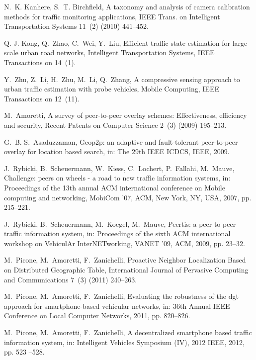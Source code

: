 \documentclass[10pt,onecolumn]{article}
\begin{document}
\begin{thebibliography}{00}
N.~K. Kanhere, S.~T. Birchfield, A taxonomy and analysis of camera calibration
  methods for traffic monitoring applications, IEEE Trans. on Intelligent
  Transportation Systems 11~(2) (2010) 441--452.

Q.-J. Kong, Q.~Zhao, C.~Wei, Y.~Liu, Efficient traffic state estimation for
  large-scale urban road networks, Intelligent Transportation Systems, IEEE
  Transactions on 14~(1).

Y.~Zhu, Z.~Li, H.~Zhu, M.~Li, Q.~Zhang, A compressive sensing approach to urban
  traffic estimation with probe vehicles, Mobile Computing, IEEE Transactions
  on 12~(11).

M.~Amoretti, A survey of peer-to-peer overlay schemes: Effectiveness,
  efficiency and security, Recent Patents on Computer Science 2~(3) (2009)
  195--213.

G.~B. S.~Asaduzzaman, Geop2p: an adaptive and fault-tolerant peer-to-peer
  overlay for location based search, in: The 29th IEEE ICDCS, IEEE, 2009.

J.~Rybicki, B.~Scheuermann, W.~Kiess, C.~Lochert, P.~Fallahi, M.~Mauve,
  Challenge: peers on wheels - a road to new traffic information systems, in:
  Proceedings of the 13th annual ACM international conference on Mobile
  computing and networking, MobiCom '07, ACM, New York, NY, USA, 2007, pp.
  215--221.

J.~Rybicki, B.~Scheuermann, M.~Koegel, M.~Mauve, Peertis: a peer-to-peer
  traffic information system, in: Proceedings of the sixth ACM international
  workshop on VehiculAr InterNETworking, VANET '09, ACM, 2009, pp. 23--32.

M.~Picone, M.~Amoretti, F.~Zanichelli, {Proactive Neighbor Localization Based
  on Distributed Geographic Table}, {International Journal of Pervasive
  Computing and Communications} 7~(3) (2011) 240--263.

M.~Picone, M.~Amoretti, F.~Zanichelli, Evaluating the robustness of the dgt
  approach for smartphone-based vehicular networks, in: 36th Annual IEEE
  Conference on Local Computer Networks, 2011, pp. 820--826.

M.~Picone, M.~Amoretti, F.~Zanichelli, A decentralized smartphone based traffic
  information system, in: Intelligent Vehicles Symposium (IV), 2012 IEEE, 2012,
  pp. 523 --528.


\end{thebibliography}
\end{document}
